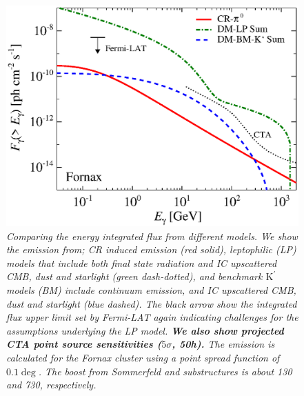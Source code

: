 \documentclass[10pt,aps,pra,reprint,amsmath,amsfonts,amssymb,showpacs,nofootinbib,floatfix]{revtex4-1}
\def\C#1{{\bf #1}}
\newcommand{\rmn}{\mathrm}
\newcommand{\Kp}{\rmn{K}^\prime}
\begin{document}
\begin{figure}
 \includegraphics[width=0.99\columnwidth]{figures/flux.int.v12.0.1deg.1.6T.SubMass.SF300.IR2.noMW.woGal.eps}
 \caption{\it Comparing the energy integrated flux from different
   models. We show the emission from; CR induced emission (red solid),
   leptophilic (LP) models that include both final state radiation and
   IC upscattered CMB, dust and starlight (green dash-dotted), and
   benchmark $\Kp$ models (BM) include continuum emission, and IC
   upscattered CMB, dust and starlight (blue dashed). The black arrow
   show the integrated flux upper limit set by Fermi-LAT again
   indicating challenges for the assumptions underlying the LP
   model. \C{We also show projected CTA point source sensitivities
     ($5\sigma$, 50h).} The emission is calculated for the Fornax
   cluster using a point spread function of $0.1\deg$. The boost from
   Sommerfeld and substructures is about 130 and 730, respectively.}
 \label{fig:flux_int}
\end{figure}
\end{document}
